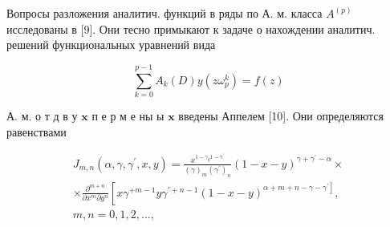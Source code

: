 \documentclass[10pt]{article}
\begin{document}
Вопросы разложения аналитич. функций в ряды по А. м. класса $A^{(p)}$ исследованы в [9]. Они тесно примыкают к задаче о нахождении аналитич. решений функциональных уравнений вида



\[

\sum_{k=0}^{p-1} A_{k}(D) y\left(z \omega_{p}^{k}\right)=f(z)

\]



А. м. о т д в у $\mathbf{x}$ п е р м е ны ы $\mathbf{x}$ введены Аппелем [10]. Они определяются равенствами



\[

\begin{gathered}

J_{m, n}\left(\alpha, \gamma, \gamma^{\prime}, x, y\right)=\frac{x^{1-\gamma_{y} 1-\gamma^{\prime}}}{(\gamma)_{m}\left(\gamma^{\prime}\right)_{n}}(1-x-y)^{\gamma+\gamma^{\prime}-\alpha} \times \\

\times \frac{\partial^{m+n}}{\partial x^{m} \partial y^{n}}\left[x \gamma^{+m-1} y \gamma^{\prime+n-1}(1-x-y)^{\left.\alpha+m+n-\gamma-\gamma^{\prime}\right]},\right. \\

m, n=0,1,2, \ldots,

\end{gathered}

\]
\end{document}
